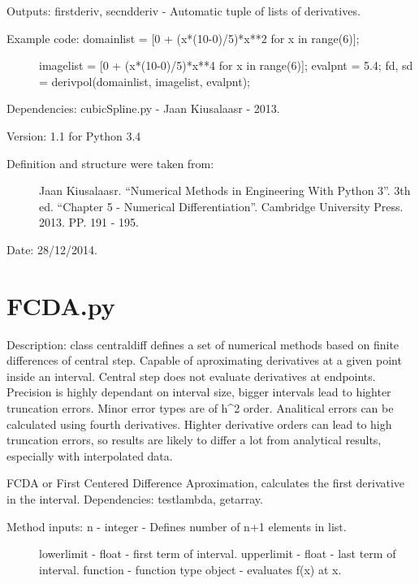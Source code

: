 \documentclass[letterpaper,10pt,oneside]{sphinxmanual}
\theoremstyle{plain}%
\theoremstyle{definition}%
\theoremstyle{remark}%
\begin{document}
Outputs: firstderiv, secndderiv - Automatic tuple of lists of derivatives.
\begin{description}
\item[{Example code: domainlist = {[}0 + (x*(10-0)/5)*x**2 for x in range(6){]};}] \leavevmode
imagelist = {[}0 + (x*(10-0)/5)*x**4 for x in range(6){]};
evalpnt = 5.4;
fd, sd = derivpol(domainlist, imagelist, evalpnt);

\end{description}

Dependencies: cubicSpline.py - Jaan Kiusalaasr - 2013.

Version: 1.1 for Python 3.4
\begin{description}
\item[{Definition and structure were taken from:}] \leavevmode
Jaan Kiusalaasr. ``Numerical Methods in Engineering With Python 3''.
3th ed. ``Chapter 5 - Numerical Differentiation''. 
Cambridge University Press. 2013. PP. 191 - 195.

\end{description}




Date: 28/12/2014.


\section{FCDA.py}
\label{code:module-FCDA}\label{code:fcda-py}
Description: class centraldiff defines a set of numerical methods based on
finite differences of central step. Capable of aproximating derivatives at
a given point inside an interval. Central step does not evaluate derivatives
at endpoints. Precision is highly dependant on interval size, bigger intervals
lead to highter truncation errors. Minor error types are of h\textasciicircum{}2 order.
Analitical errors can be calculated using fourth derivatives. Highter
derivative orders can lead to high truncation errors, so results are likely
to differ a lot from analytical results, especially with interpolated data.

FCDA or First Centered Difference Aproximation, calculates the first
derivative in the interval. Dependencies: testlambda, getarray.
\begin{description}
\item[{Method inputs: n - integer - Defines number of n+1 elements in list.}] \leavevmode
lowerlimit - float - first term of interval.
upperlimit - float - last term of interval.
function - function type object - evaluates f(x) at x.

\end{description}
\end{document}
